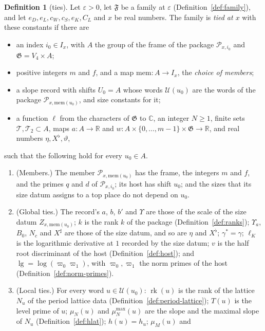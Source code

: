 \documentclass[11pt]{amsbook}
\theoremstyle{plain}
\theoremstyle{definition}
\newtheorem{definition}[theorem]{Definition}
\theoremstyle{remark}
\numberwithin{equation}{section}
\numberwithin{figure}{chapter}
\numberwithin{table}{chapter}
\newcommand{\R}{\mathbb{R}}
\renewcommand{\C}{\mathbb{C}}
\newcommand{\eps}{\varepsilon}
\newcommand{\rk}{\operatorname{rk}}
\newcommand{\GG}{\mathfrak{G}}
\newcommand{\Top}{\mathcal{T}}
\newcommand{\Words}{\mathcal{U}}
\newcommand{\lgv}{\operatorname{lg}}
\newcommand{\Fam}{\mathfrak{F}}
\begin{document}
\begin{definition}[ties]\label{def:tied}
Let $\eps>0$, let $\Fam$ be a family at $\eps$
(Definition~\ref{def:family}), and let $e_D,e_L,c_W,c_S,e_K,C_L$ and
$x$ be real numbers. The family is \emph{tied at $x$} with these
constants if there are
\begin{itemize}
\item an index $i_0\in I_x$, with $A$ the group of the frame of the
package $\mathcal P_{x,i_0}$ and $\GG=V_4\times A$;
\item positive integers $m$ and $f$, and a map $\mathrm{mem}\colon A\to
I_x$, the \emph{choice of members};
\item a slope record with shifts $U_0=A$ whose words $\Words(u_0)$ are
the words of the package $\mathcal P_{x,\mathrm{mem}(u_0)}$, and size
constants for it;
\item a function $\ell$ from the characters of $\GG$ to $\C$, an
integer $N\ge1$, finite sets $\Top,\Top_2\subset A$, maps
$a\colon A\to\R$ and
$w\colon A\times\{0,\dots,m-1\}\times\GG\to\R$, and real numbers
$\eta,X^\flat,\vartheta$,
\end{itemize}
such that the following hold for every $u_0\in A$.
\begin{enumerate}[label=(\arabic*)]
\item (Members.) The member $\mathcal P_{x,\mathrm{mem}(u_0)}$ has the
frame, the integers $m$ and $f$, and the primes $q$ and $d$ of
$\mathcal P_{x,i_0}$; its host has shift $u_0$; and the sizes that its
size datum assigns to a top place do not depend on $u_0$.
\item (Global ties.) The record's $a$, $b$, $b'$ and $\Upsilon$ are
those of the scale of the size datum $Z_{x,\mathrm{mem}(u_0)}$; $k$ is
the rank $k$ of the package (Definition~\ref{def:ranks}); $\Upsilon_a$,
$B_0$, $N_c$ and $X^\sharp$ are those of the size datum, and so are
$\eta$ and $X^\flat$; $\gamma^*=\gamma$; $\ell_K$ is the logarithmic
derivative at $1$ recorded by the size datum; $v$ is the half root
discriminant of the host (Definition~\ref{def:host}); and
$\lgv=\log(\varpi_0\varpi_1)$, with $\varpi_0,\varpi_1$
the norm primes of the host (Definition~\ref{def:norm-primes}).
\item (Local ties.) For every word $u\in\Words(u_0)$: $\rk(u)$ is the
rank of the lattice $N_u$ of the period lattice data
(Definition~\ref{def:period-lattice}); $T(u)$ is the level prime of
$u$; $\mu_N(u)$ and $\mu_N^{\max}(u)$ are the slope and the maximal
slope of $N_u$ (Definition~\ref{def:hlat}); $h(u)=h_u$; $\mu_M(u)$ and

\end{enumerate}
\end{definition}
\end{document}
